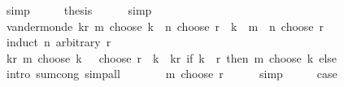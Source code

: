 \begin{isabellebody}
\ simp\isanewline
\ \ \isamarkupfalse%
\ \isamarkupfalse%
\ {\isacharquery}{\kern0pt}thesis\isanewline
\ \ \ \ \isamarkupfalse%
\ simp\isanewline
{}\isamarkupfalse%
%
\endisatagproof
{\isafoldproof}%
%
\isadelimproof
\isanewline
%
\endisadelimproof
\isanewline
{}\isamarkupfalse%
\ vandermonde{\isacharcolon}{\kern0pt}\ {\isachardoublequoteopen}{\isacharparenleft}{\kern0pt}{\isasymSum}k{\isasymle}r{\isachardot}{\kern0pt}\ {\isacharparenleft}{\kern0pt}m\ choose\ k{\isacharparenright}{\kern0pt}\ {\isacharasterisk}{\kern0pt}\ {\isacharparenleft}{\kern0pt}n\ choose\ {\isacharparenleft}{\kern0pt}r\ {\isacharminus}{\kern0pt}\ k{\isacharparenright}{\kern0pt}{\isacharparenright}{\kern0pt}{\isacharparenright}{\kern0pt}\ {\isacharequal}{\kern0pt}\ {\isacharparenleft}{\kern0pt}m\ {\isacharplus}{\kern0pt}\ n{\isacharparenright}{\kern0pt}\ choose\ r{\isachardoublequoteclose}\isanewline
%
\isadelimproof
%
\endisadelimproof
%
\isatagproof
{}\isamarkupfalse%
\ {\isacharparenleft}{\kern0pt}induct\ n\ arbitrary{\isacharcolon}{\kern0pt}\ r{\isacharparenright}{\kern0pt}\isanewline
\ \ \isamarkupfalse%
\ {}\isanewline
\ \ \isamarkupfalse%
\ {\isachardoublequoteopen}{\isacharparenleft}{\kern0pt}{\isasymSum}k{\isasymle}r{\isachardot}{\kern0pt}\ {\isacharparenleft}{\kern0pt}m\ choose\ k{\isacharparenright}{\kern0pt}\ {\isacharasterisk}{\kern0pt}\ {\isacharparenleft}{\kern0pt}{}\ choose\ {\isacharparenleft}{\kern0pt}r\ {\isacharminus}{\kern0pt}\ k{\isacharparenright}{\kern0pt}{\isacharparenright}{\kern0pt}{\isacharparenright}{\kern0pt}\ {\isacharequal}{\kern0pt}\ {\isacharparenleft}{\kern0pt}{\isasymSum}k{\isasymle}r{\isachardot}{\kern0pt}\ if\ k\ {\isacharequal}{\kern0pt}\ r\ then\ {\isacharparenleft}{\kern0pt}m\ choose\ k{\isacharparenright}{\kern0pt}\ else\ {}{\isacharparenright}{\kern0pt}{\isachardoublequoteclose}\isanewline
\ \ \ \ \isamarkupfalse%
\ {\isacharparenleft}{\kern0pt}intro\ sum{\isachardot}{\kern0pt}cong{\isacharparenright}{\kern0pt}\ simp{\isacharunderscore}{\kern0pt}all\isanewline
\ \ \isamarkupfalse%
\ \isamarkupfalse%
\ {\isachardoublequoteopen}{\isasymdots}\ {\isacharequal}{\kern0pt}\ m\ choose\ r{\isachardoublequoteclose}\isanewline
\ \ \ \ \isamarkupfalse%
\ simp\isanewline
\ \ \isamarkupfalse%
\ \isamarkupfalse%
\ {\isacharquery}{\kern0pt}case\isanewline
\ \ \ \ \isamarkupfalse%

\end{isabellebody}
